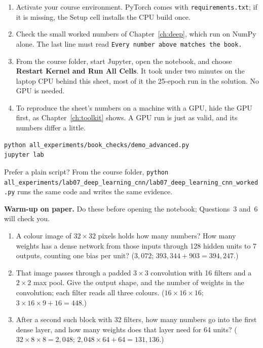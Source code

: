 \begin{labmode}
\begin{enumerate}
  \item Activate your course environment. PyTorch comes with \texttt{requirements.txt}; if it is missing, the Setup cell installs the CPU build once.
  \item Check the small worked numbers of Chapter~\ref{ch:deep}, which run on NumPy alone. The last line must read \texttt{Every number above matches the book.}
  \item From the course folder, start Jupyter, open the notebook, and choose \textbf{Restart Kernel and Run All Cells}. It took under two minutes on the laptop CPU behind this sheet, most of it the 25-epoch run in the solution. No GPU is needed.
  \item To reproduce the sheet's numbers on a machine with a GPU, hide the GPU first, as Chapter~\ref{ch:toolkit} shows. A GPU run is just as valid, and its numbers differ a little.
\end{enumerate}
\begin{lstlisting}[style=utpterminal]
python all_experiments/book_checks/demo_advanced.py
jupyter lab
\end{lstlisting}
Prefer a plain script? From the course folder, \texttt{python all\_experiments/\allowbreak lab07\_deep\_learning\_cnn/\allowbreak lab07\_deep\_learning\_cnn\_worked.py} runs the same code and writes the same evidence.
\end{labmode}

\labroutine

\begin{yourturn}
\textbf{Warm-up on paper.} Do these before opening the notebook; Questions~3 and~6 will check you.
\begin{enumerate}
  \item A colour image of $32\times32$ pixels holds how many numbers? How many weights has a dense network from those inputs through 128 hidden units to 7 outputs, counting one bias per unit? ($3{,}072$; $393{,}344+903=394{,}247$.)
  \item That image passes through a padded $3\times3$ convolution with 16 filters and a $2\times2$ max pool. Give the output shape, and the number of weights in the convolution; each filter reads all three colours. ($16\times16\times16$; $3\times16\times9+16=448$.)
  \item After a second such block with 32 filters, how many numbers go into the first dense layer, and how many weights does that layer need for 64 units? ($32\times8\times8=2{,}048$; $2{,}048\times64+64=131{,}136$.)
\end{enumerate}
\end{yourturn}


